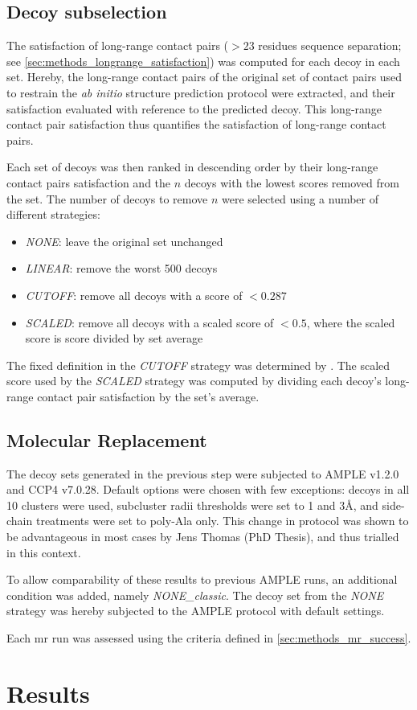 \subsection{Decoy subselection}
The satisfaction of long-range contact pairs ($>23$ residues sequence separation; see \cref{sec:methods_longrange_satisfaction}) was computed for each decoy in each set. Hereby, the long-range contact pairs of the original set of contact pairs used to restrain the \textit{ab initio} structure prediction protocol were extracted, and their satisfaction evaluated with reference to the predicted decoy. This long-range contact pair satisfaction thus quantifies the satisfaction of long-range contact pairs.

Each set of decoys was then ranked in descending order by their long-range contact pairs satisfaction and the $n$ decoys with the lowest scores removed from the set. The number of decoys to remove $n$ were selected using a number of different strategies:

\begin{itemize}
    \item \textit{NONE}: leave the original set unchanged
    \item \textit{LINEAR}: remove the worst 500 decoys
    \item \textit{CUTOFF}: remove all decoys with a score of $<0.287$ 
    \item \textit{SCALED}: remove all decoys with a scaled score of $<0.5$, where the scaled score is score divided by set average
\end{itemize}

The fixed definition in the \textit{CUTOFF} strategy was determined by \textcite{De_Oliveira2017-gj}. The scaled score used by the \textit{SCALED} strategy was computed by dividing each decoy's long-range contact pair satisfaction by the set's average.

\subsection{Molecular Replacement}
The decoy sets generated in the previous step were subjected to AMPLE v1.2.0 and CCP4 v7.0.28. Default options were chosen with few exceptions: decoys in all 10 clusters were used, subcluster radii thresholds were set to 1 and 3\AA, and side-chain treatments were set to poly-Ala only. This change in protocol was shown to be advantageous in most cases by Jens Thomas (PhD Thesis), and thus trialled in this context. 

To allow comparability of these results to previous AMPLE runs, an additional condition was added, namely \textit{NONE\_classic}. The decoy set from the \textit{NONE} strategy was hereby subjected to the AMPLE protocol with default settings.

Each \gls{mr} run was assessed using the criteria defined in \cref{sec:methods_mr_success}.


\section{Results}

